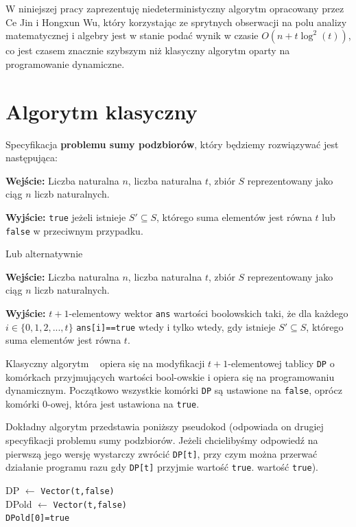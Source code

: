 \documentclass{article}
\begin{document}
W niniejszej pracy zaprezentuję niedeterministyczny algorytm opracowany przez Ce Jin 
i Hongxun Wu, który korzystając ze sprytnych obserwacji na polu analizy matematycznej i algebry jest w 
stanie podać wynik w czasie $O(n+t\log^2(t))$, co jest czasem znacznie szybszym niż klasyczny algorytm 
oparty na programowanie dynamiczne. 



\section{Algorytm klasyczny}
Specyfikacja \textbf{problemu sumy podzbiorów}, który będziemy rozwiązywać jest następująca:

\begin{tcolorbox}
    \textbf{Wejście:} Liczba naturalna $n$, liczba naturalna $t$, zbiór $S$ reprezentowany jako ciąg $n$ liczb naturalnych.
    
    \textbf{Wyjście:} \texttt{true} jeżeli istnieje $S' \subseteq S$, którego suma elementów jest równa $t$ lub 
    \texttt{false} w przeciwnym przypadku.
\end{tcolorbox}
Lub alternatywnie
\begin{tcolorbox}
    \textbf{Wejście:} Liczba naturalna $n$, liczba naturalna $t$, zbiór $S$ reprezentowany jako ciąg $n$ liczb naturalnych.
    
    \textbf{Wyjście:} $t+1$-elementowy wektor \texttt{ans} wartości boolowskich taki, że dla każdego
    $i \in \{0,1,2,...,t\}$ \texttt{ans[i]==true} wtedy i tylko wtedy, gdy
    istnieje $S' \subseteq S$, którego suma elementów jest równa $t$.
\end{tcolorbox}


Klasyczny algorytm ~\cite{martello1984mixture} opiera się na modyfikacji $t+1$-elementowej tablicy \texttt{DP} o komórkach przyjmujących wartości bool-owskie i 
opiera się na programowaniu dynamicznym. Początkowo wszystkie komórki \texttt{DP} są ustawione na \texttt{false}, oprócz komórki 
$0$-owej, która
jest ustawiona na \texttt{true}.

Dokładny algorytm przedstawia poniższy pseudokod (odpowiada on drugiej specyfikacji problemu sumy podzbiorów. Jeżeli chcielibyśmy
odpowiedź na pierwszą jego wersję wystarczy zwrócić \texttt{DP[t]}, przy czym można przerwać działanie programu razu gdy 
\texttt{DP[t]} przyjmie wartość \texttt{true}.
wartość \texttt{true}).

\begin{algorithm}
    DP $\leftarrow$ \texttt{Vector(t,false)} \\
    DPold $\leftarrow$ \texttt{Vector(t,false)} \\
    \texttt{DPold[0]=true} \\
\end{algorithm}
\end{document}
